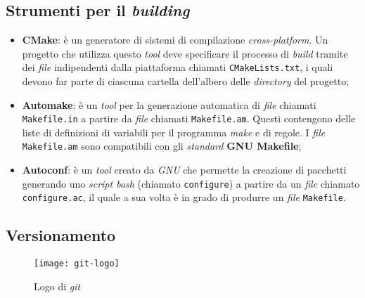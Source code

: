   \subsection{Strumenti per il \textit{building}} 
    \begin{itemize}
	\item \textbf{CMake}: è un generatore di sistemi di compilazione \textit{cross-platform}. Un progetto che utilizza questo \textit{tool} deve specificare
	      		      il processo di \textit{build} tramite dei \textit{file} indipendenti dalla piattaforma chiamati \texttt{CMakeLists.txt}, i quali 
			      devono far parte di ciascuna cartella dell'albero delle \textit{directory} del progetto;

        \item \textbf{Automake}: è un \textit{tool} per la generazione automatica di \textit{file} chiamati \texttt{Makefile.in} a partire
	      			 da \textit{file} chiamati \texttt{Makefile.am}. Questi contengono delle liste di definizioni di variabili
				 per il programma \textit{make} e di regole. I \textit{file} \texttt{Makefile.am} sono compatibili con gli 
				 \textit{standard} \textbf{GNU Makefile};
	\item \textbf{Autoconf}: è un \textit{tool} creato da \textit{GNU} che permette la creazione di pacchetti generando uno \textit{script bash}
                                 (chiamato \texttt{configure}) a partire da un \textit{file} chiamato \texttt{configure.ac},
	      			 il quale a sua volta è in grado di produrre un \textit{file} \texttt{Makefile}.
    \end{itemize}

   \subsection{Versionamento}
      \begin{figure}[!h] 
        \centering 
        \texttt{[image: git-logo]} 
        \caption{Logo di \textit{git}}
      \end{figure} 

